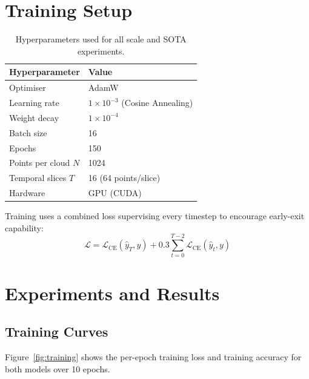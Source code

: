 \documentclass[11pt,a4paper]{article}
\begin{document}
\section{Training Setup}

\begin{table}[H]
  \centering
  \caption{Hyperparameters used for all scale and SOTA experiments.}
  \label{tab:hyper}
  \begin{tabular}{ll}
    \toprule
    \textbf{Hyperparameter} & \textbf{Value} \\
    \midrule
    Optimiser           & AdamW \\
    Learning rate       & $1 \times 10^{-3}$ (Cosine Annealing) \\
    Weight decay        & $1 \times 10^{-4}$ \\
    Batch size          & 16 \\
    Epochs              & 150 \\
    Points per cloud $N$& 1024 \\
    Temporal slices $T$ & 16 (64 points/slice) \\
    Hardware            & GPU (CUDA) \\
    \bottomrule
  \end{tabular}
\end{table}

Training uses a combined loss supervising every timestep to encourage early-exit capability:
\begin{equation}
  \mathcal{L} = \mathcal{L}_{\text{CE}}(\hat{y}_T, y)
              + 0.3 \sum_{t=0}^{T-2} \mathcal{L}_{\text{CE}}(\hat{y}_t, y)
\end{equation}

\section{Experiments and Results}

\subsection{Training Curves}

Figure~\ref{fig:training} shows the per-epoch training loss and training
accuracy for both models over 10 epochs.
\end{document}
